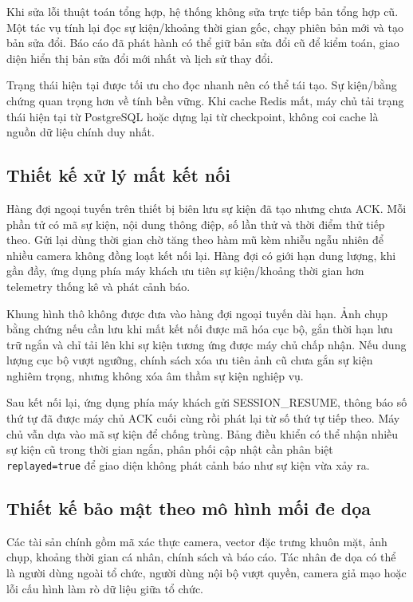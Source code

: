 Khi sửa lỗi thuật toán tổng hợp, hệ thống không sửa trực tiếp bản tổng hợp cũ. Một tác vụ tính lại đọc sự kiện/khoảng thời gian gốc, chạy phiên bản mới và tạo bản sửa đổi. Báo cáo đã phát hành có thể giữ bản sửa đổi cũ để kiểm toán, giao diện hiển thị bản sửa đổi mới nhất và lịch sử thay đổi.

Trạng thái hiện tại được tối ưu cho đọc nhanh nên có thể tái tạo. Sự kiện/bằng chứng quan trọng hơn về tính bền vững. Khi cache Redis mất, máy chủ tải trạng thái hiện tại từ PostgreSQL hoặc dựng lại từ checkpoint, không coi cache là nguồn dữ liệu chính duy nhất.

\subsection{Thiết kế xử lý mất kết nối}
Hàng đợi ngoại tuyến trên thiết bị biên lưu sự kiện đã tạo nhưng chưa ACK. Mỗi phần tử có mã sự kiện, nội dung thông điệp, số lần thử và thời điểm thử tiếp theo. Gửi lại dùng thời gian chờ tăng theo hàm mũ kèm nhiễu ngẫu nhiên để nhiều camera không đồng loạt kết nối lại. Hàng đợi có giới hạn dung lượng, khi gần đầy, ứng dụng phía máy khách ưu tiên sự kiện/khoảng thời gian hơn telemetry thống kê và phát cảnh báo.

Khung hình thô không được đưa vào hàng đợi ngoại tuyến dài hạn. Ảnh chụp bằng chứng nếu cần lưu khi mất kết nối được mã hóa cục bộ, gắn thời hạn lưu trữ ngắn và chỉ tải lên khi sự kiện tương ứng được máy chủ chấp nhận. Nếu dung lượng cục bộ vượt ngưỡng, chính sách xóa ưu tiên ảnh cũ chưa gắn sự kiện nghiêm trọng, nhưng không xóa âm thầm sự kiện nghiệp vụ.

Sau kết nối lại, ứng dụng phía máy khách gửi SESSION\_RESUME, thông báo số thứ tự đã được máy chủ ACK cuối cùng rồi phát lại từ số thứ tự tiếp theo. Máy chủ vẫn dựa vào mã sự kiện để chống trùng. Bảng điều khiển có thể nhận nhiều sự kiện cũ trong thời gian ngắn, phân phối cập nhật cần phân biệt \texttt{replayed=true} để giao diện không phát cảnh báo như sự kiện vừa xảy ra.

\subsection{Thiết kế bảo mật theo mô hình mối đe dọa}
Các tài sản chính gồm mã xác thực camera, vector đặc trưng khuôn mặt, ảnh chụp, khoảng thời gian cá nhân, chính sách và báo cáo. Tác nhân đe dọa có thể là người dùng ngoài tổ chức, người dùng nội bộ vượt quyền, camera giả mạo hoặc lỗi cấu hình làm rò dữ liệu giữa tổ chức.

